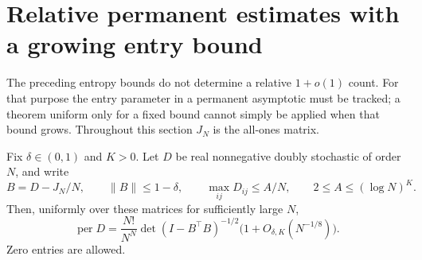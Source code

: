 \section{Relative permanent estimates with a growing entry bound}
\label{sec:relativepermanents}
The preceding entropy bounds do not determine a relative
\(1+o(1)\) count.
For that purpose the entry parameter in a permanent asymptotic
must be tracked; a theorem uniform only for a fixed bound
cannot simply be applied when that bound grows.
Throughout this section \(J_N\) is the all-ones matrix.

\begin{theorem}
\label{thm:growingpermanent}
Fix \(\delta\in(0,1)\) and \(K>0\).
Let \(D\) be real nonnegative doubly stochastic of order \(N\),
and write
\[
 B=D-J_N/N,\qquad
 \|B\|\leq1-\delta,\qquad
 \max_{ij}D_{ij}\leq A/N,\qquad 2\leq A\leq(\log N)^K .
\]
Then, uniformly over these matrices for sufficiently large \(N\),
\[
 \operatorname{per}D
 =\frac{N!}{N^N}\det(I-B^\top B)^{-1/2}
                       \bigl(1+O_{\delta,K}(N^{-1/8})\bigr).
\]
Zero entries are allowed.
\end{theorem}

